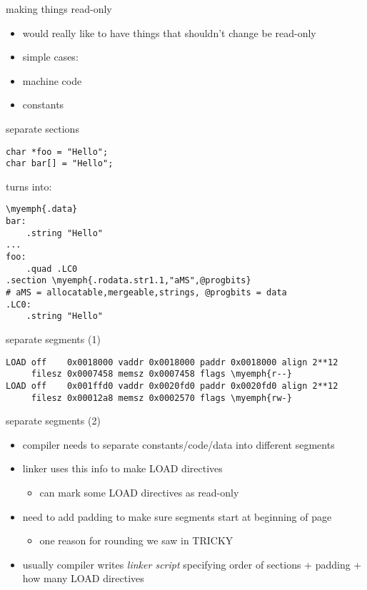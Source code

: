 \begin{frame}{making things read-only}
    \begin{itemize}
    \item would really like to have things that shouldn't change be read-only
    \vspace{.5cm}
    \item simple cases:
    \item machine code
    \item constants
    \end{itemize}
\end{frame}

\begin{frame}[fragile]{separate sections}
\begin{Verbatim}[fontsize=\small]
char *foo = "Hello";
char bar[] = "Hello";
\end{Verbatim}
turns into:
\begin{Verbatim}[fontsize=\small,commandchars=\\\{\}]
\myemph{.data}
bar:
    .string "Hello"
...
foo:
    .quad .LC0
.section \myemph{.rodata.str1.1,"aMS",@progbits}
# aMS = allocatable,mergeable,strings, @progbits = data
.LC0:
    .string "Hello"
\end{Verbatim}
\end{frame}

\begin{frame}[fragile]{separate segments (1)}
\begin{Verbatim}[fontsize=\small,commandchars=\\\{\}]
LOAD off    0x0018000 vaddr 0x0018000 paddr 0x0018000 align 2**12
     filesz 0x0007458 memsz 0x0007458 flags \myemph{r--}
LOAD off    0x001ffd0 vaddr 0x0020fd0 paddr 0x0020fd0 align 2**12
     filesz 0x00012a8 memsz 0x0002570 flags \myemph{rw-}
\end{Verbatim}
\end{frame}

\begin{frame}{separate segments (2)}
\begin{itemize}
\item compiler needs to separate constants/code/data into different segments
\item linker uses this info to make LOAD directives
    \begin{itemize}
    \item can mark some LOAD directives as read-only
    \end{itemize}
\item need to add padding to make sure segments start at beginning of page 
    \begin{itemize}
    \item one reason for rounding we saw in TRICKY
    \end{itemize}
\item usually compiler writes \textit{linker script} specifying order of sections + padding + how many LOAD directives
\end{itemize}
\end{frame}


